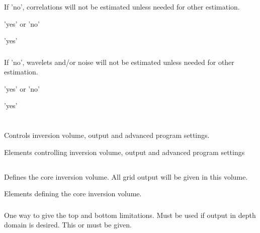 \subsubsection{}  
 \slist
   \item \Description If 'no', correlations will not be estimated unless needed for other estimation.
   \item \Argument 'yes' or 'no'
   \item \Default 'yes'
 \elist

\subsubsection{}  
 \slist
   \item \Description If 'no', wavelets and/or noise will not be estimated unless needed for other estimation.
   \item \Argument 'yes' or 'no'
   \item \Default 'yes'
 \elist

 \section{\necessary} 
 \slist
   \item \Description Controls inversion volume, output and advanced program settings.
   \item \Argument Elements controlling inversion volume, output and advanced program settings
   \item \Default
 \elist

\subsection{\necessary} 
 \slist
   \item \Description Defines the core inversion volume. All grid output will be given in this volume.
   \item \Argument Elements defining the core inversion volume.
   \item \Default
 \elist

\subsubsection{} 
 \slist
   \item \Description One way to give the top and bottom limitations. Must be used if output in depth domain is desired. This or  must be given.
   \item \Argument
   \item \Default
 \elist

